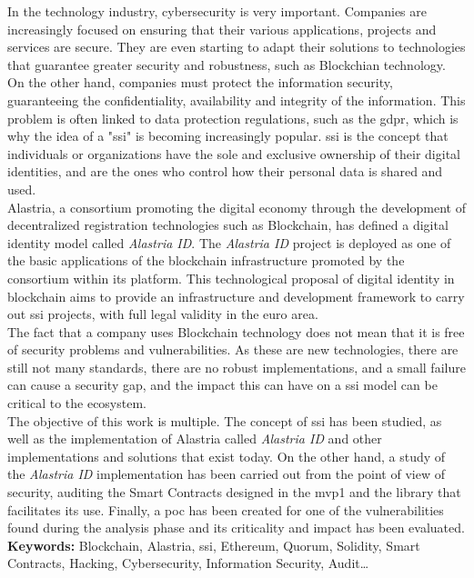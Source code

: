 In the technology industry, cybersecurity is very important.  Companies are increasingly focused on ensuring that their various applications, projects and services are secure.  They are even starting to adapt their solutions to technologies that guarantee greater security and robustness, such as Blockchian technology.\\

On the other hand, companies must protect the information security, guaranteeing the confidentiality, availability and integrity of the information. This problem is often linked to data protection regulations, such as the \acrshort{gdpr}, which is why the idea of a "\acrlong{ssi}" is becoming increasingly popular.  \acrfull{ssi} is the concept that individuals or organizations have the sole and exclusive ownership of their digital identities, and are the ones who control how their personal data is shared and used.\\

Alastria, a consortium promoting the digital economy through the development of decentralized registration technologies such as Blockchain, has defined a digital identity model called \textit{Alastria ID}. The \textit{Alastria ID} project is deployed as one of the basic applications of the blockchain infrastructure promoted by the consortium within its platform.  This technological proposal of digital identity in blockchain aims to provide an infrastructure and development framework to carry out \acrfull{ssi} projects, with full legal validity in the euro area.\\

The fact that a company uses Blockchain technology does not mean that it is free of security problems and vulnerabilities.  As these are new technologies, there are still not many standards, there are no robust implementations, and a small failure can cause a security gap, and the impact this can have on a \acrlong{ssi} model can be critical to the ecosystem.\\

The objective of this work is multiple. The concept of \acrfull{ssi} has been studied, as well as the implementation of Alastria called \textit{Alastria ID} and other implementations and solutions that exist today. On the other hand, a study of the \textit{Alastria ID} implementation has been carried out from the point of view of security, auditing the Smart Contracts designed in the \acrshort{mvp}1 and the library that facilitates its use. Finally, a \acrlong{poc} has been created for one of the vulnerabilities found during the analysis phase and its criticality and impact has been evaluated.\\

\textbf{Keywords:} Blockchain, Alastria, \acrlong{ssi}, Ethereum, Quorum, Solidity, Smart Contracts, Hacking, Cybersecurity, Information Security, Audit\ldots

